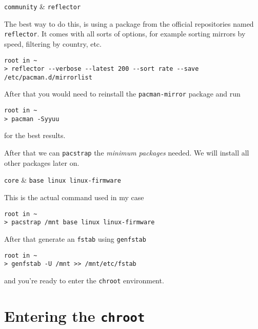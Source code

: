 \documentclass[10pt]{dustdoc}
\begin{document}
\begin{NOTE}
    \begin{pkgtable}
        \texttt{community} & \texttt{reflector} \\
    \end{pkgtable}

    The best way to do this, is using a package from the official repositories named \texttt{reflector}.
    It comes with all sorts of options, for example sorting mirrors by speed, filtering by country, etc.

    \begin{verbatim}
root in ~
> reflector --verbose --latest 200 --sort rate --save /etc/pacman.d/mirrorlist
    \end{verbatim}

    After that you would need to reinstall the \texttt{pacman-mirror} package and run

    \begin{verbatim}
root in ~
> pacman -Syyuu
    \end{verbatim}

    \noindent
    for the best results.
\end{NOTE}

After that we can \texttt{pacstrap} the \emph{minimum packages} needed.
We will install all other packages later on.

\begin{pkgtable}
    \texttt{core} & \texttt{base linux linux-firmware} \\
\end{pkgtable}

\begin{NOTE}
    This is the actual command used in my case

    \begin{verbatim}
root in ~
> pacstrap /mnt base linux linux-firmware
    \end{verbatim}
\end{NOTE}

After that generate an \texttt{fstab} using \texttt{genfstab}

\begin{verbatim}
root in ~
> genfstab -U /mnt >> /mnt/etc/fstab
\end{verbatim}

\noindent
and you’re ready to enter the \texttt{chroot} environment.

\chapter{Entering the \texttt{chroot}}%
\label{sec:entering-the-chroot}
\end{document}
